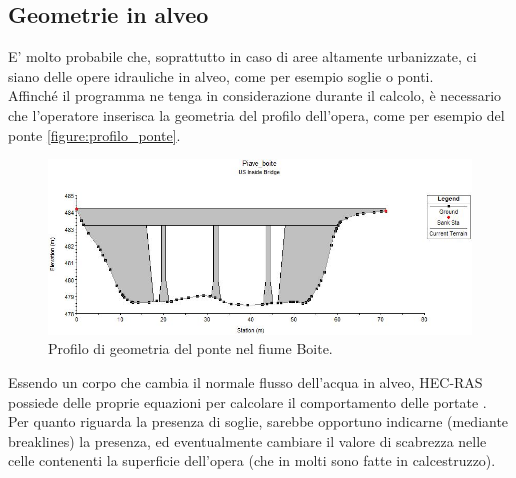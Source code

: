 \subsection{Geometrie in alveo}
E' molto probabile che, soprattutto in caso di aree altamente urbanizzate, ci siano delle opere idrauliche in alveo, come per esempio soglie o ponti.\\
Affinché il programma ne tenga in considerazione durante il calcolo, è necessario che l'operatore inserisca la geometria del profilo dell'opera, come per esempio del ponte \eqref{figure:profilo_ponte}. 
\begin{figure}[htb] \centering
    \includegraphics[scale=0.6]{immagini/profilo_ponte.JPG}
    \caption{Profilo di geometria del ponte nel fiume Boite.}
    \label{figure:profilo_ponte}
    \end{figure}
Essendo un corpo che cambia il normale flusso dell'acqua in alveo, HEC-RAS possiede delle proprie equazioni per calcolare il comportamento delle portate \cite{modeling_bridges}.\\
Per quanto riguarda la presenza di soglie, sarebbe opportuno indicarne (mediante breaklines) la presenza, ed eventualmente cambiare il valore di scabrezza nelle celle contenenti la superficie dell'opera (che in molti sono fatte in calcestruzzo).


